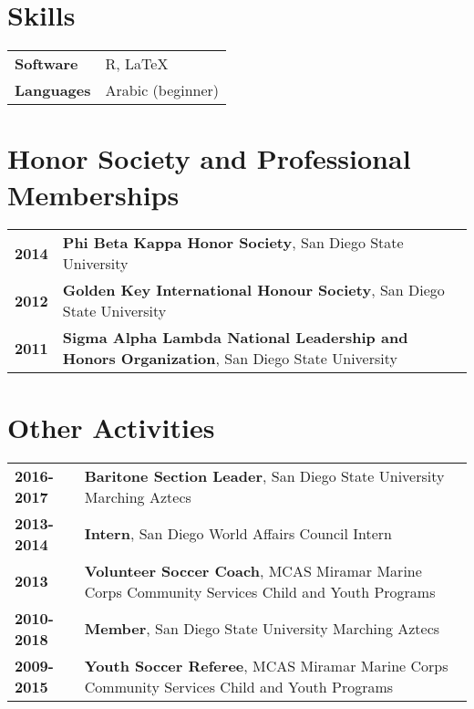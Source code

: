 \documentclass[letterpaper,12pt]{article}
\begin{document}
\section{Skills}
\begin{tabularx}{\linewidth}{@{}l X@{}}
\textbf{Software} &  R, \LaTeX\\
\textbf{Languages} & Arabic (beginner)
\end{tabularx}

\section{Honor Society and Professional Memberships}
\begin{tabularx}{\linewidth}{@{}l @{\hspace{0.6in}} X@{}}
\textbf{2014} &  \textbf{Phi Beta Kappa Honor Society}, San Diego State University\\
\textbf{2012} &  \textbf{Golden Key International Honour Society}, San Diego State University\\
\textbf{2011} &  \textbf{Sigma Alpha Lambda National Leadership and Honors Organization}, San Diego State University
\end{tabularx}

\section{Other Activities}
\begin{tabularx}{\linewidth}{@{}l X@{}}
\textbf{2016-2017} &  \textbf{Baritone Section Leader}, San Diego State University Marching Aztecs\\
\textbf{2013-2014} &  \textbf{Intern}, San Diego World Affairs Council Intern\\
\textbf{2013} &  \textbf{Volunteer Soccer Coach}, MCAS Miramar Marine Corps Community Services Child and Youth Programs\\
\textbf{2010-2018} &  \textbf{Member}, San Diego State University Marching Aztecs\\
\textbf{2009-2015} &  \textbf{Youth Soccer Referee}, MCAS Miramar Marine Corps Community Services Child and Youth Programs
\end{tabularx}

\vfill
{}
\end{document}

